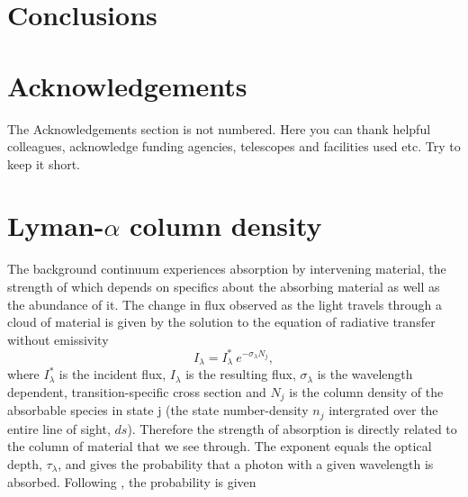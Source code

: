 \documentclass[a4paper,fleqn,usenatbib]{mnras}
\begin{document}
\section{Conclusions}



\section*{Acknowledgements}

The Acknowledgements section is not numbered. Here you can thank helpful
colleagues, acknowledge funding agencies, telescopes and facilities used etc.
Try to keep it short.










\appendix

\section{Lyman-$\alpha$ column density}

The background continuum experiences absorption by intervening material, the
strength of which depends on specifics about the absorbing material as well as
the abundance of it. The change in flux observed as the light travels through a
cloud of material is given by the solution to the equation of radiative transfer without emissivity
\begin{equation}
I_\lambda = I_\lambda^* \  e^{ - \sigma_{\lambda} N_j}, 
\end{equation} 
where $I_\lambda^*$ is the incident flux, $I_\lambda$ is
the resulting flux, $\sigma_{\lambda}$ is the wavelength dependent,
transition-specific cross section and $N_j$ is the column density of the absorbable species in state j  (the state
number-density $n_j$ intergrated over the entire line of sight, $ds$). Therefore the strength of absorption is directly related to the column of material that we see through. The exponent equals the optical depth, $\tau_\lambda$, and gives the probability that a photon with a given wavelength is absorbed. Following \citet{TepperGarcia2006}, the probability is given
\end{document}
